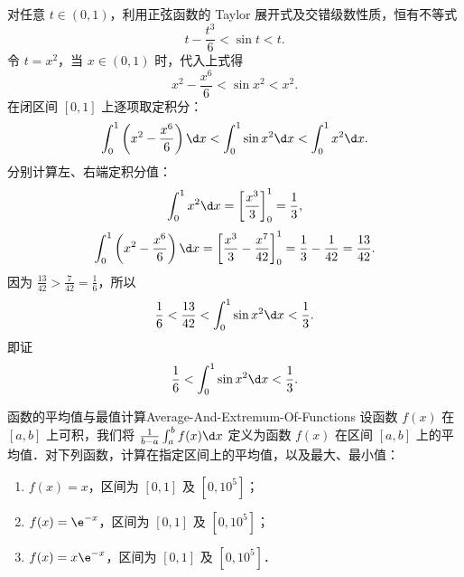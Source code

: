\begin{myproof}
    对任意 $t \in (0, 1)$，利用正弦函数的 Taylor 展开式及交错级数性质，恒有不等式
    \begin{equation}
        t - \frac{t^3}{6} < \sin t < t.
    \end{equation}
    令 $t = x^2$，当 $x \in (0, 1)$ 时，代入上式得
    \begin{equation}
        x^2 - \frac{x^6}{6} < \sin x^2 < x^2.
    \end{equation}
    在闭区间 $[0, 1]$ 上逐项取定积分：
    \begin{equation}
        \int_0^1 \left( x^2 - \frac{x^6}{6} \right) \d x < \int_0^1 \sin x^2 \d x < \int_0^1 x^2 \d x.
    \end{equation}
    分别计算左、右端定积分值：
    \begin{equation}
        \int_0^1 x^2 \d x = \left[ \frac{x^3}{3} \right]_0^1 = \frac{1}{3},
    \end{equation}
    \begin{equation}
        \int_0^1 \left( x^2 - \frac{x^6}{6} \right) \d x = \left[ \frac{x^3}{3} - \frac{x^7}{42} \right]_0^1 = \frac{1}{3} - \frac{1}{42} = \frac{13}{42}.
    \end{equation}
    因为 $\frac{13}{42} > \frac{7}{42} = \frac{1}{6}$，所以
    \begin{equation}
        \frac{1}{6} < \frac{13}{42} < \int_0^1 \sin x^2 \d x < \frac{1}{3}.
    \end{equation}
    即证
    \begin{equation}
        \frac{1}{6} < \int_0^1 \sin x^2 \d x < \frac{1}{3}.
    \end{equation}
\end{myproof}

\begin{problem}{函数的平均值与最值计算}{Average-And-Extremum-Of-Functions}
    设函数 $f(x)$ 在 $[a, b]$ 上可积，我们将 $\frac{1}{b-a}\int_a^b f(x) \d x$ 定义为函数 $f(x)$ 在区间 $[a, b]$ 上的平均值．对下列函数，计算在指定区间上的平均值，以及最大、最小值：
    \begin{enumerate}
        \item $f(x) = x$，区间为 $[0, 1]$ 及 $[0, 10^5]$；
        \item $f(x) = \e^{-x}$，区间为 $[0, 1]$ 及 $[0, 10^5]$；
        \item $f(x) = x\e^{-x}$，区间为 $[0, 1]$ 及 $[0, 10^5]$．
    \end{enumerate}
\end{problem}

